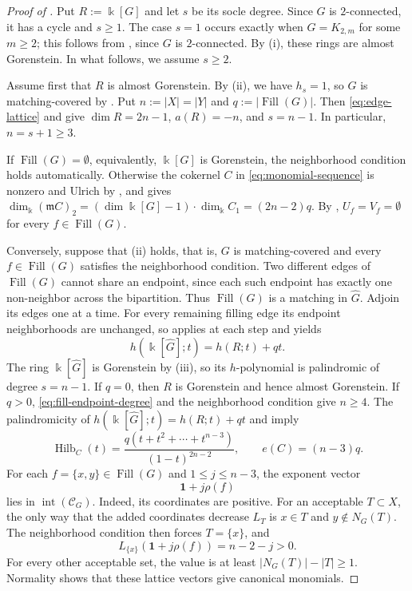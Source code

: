 \documentclass[a4paper,reqno,11pt]{amsart}
\theoremstyle{definition}
\theoremstyle{remark}
\numberwithin{equation}{section}
\newcommand{\kk}{\Bbbk}
\newcommand{\one}{\mathbf 1}
\newcommand{\frakm}{\mathfrak m}
\newcommand{\Fill}{\operatorname{Fill}}
\DeclareMathOperator{\relint}{int}
\newcommand{\Hilb}{\operatorname{Hilb}}
\begin{document}
\begin{proof}[Proof of ]
    Put $R:=\kk[G]$ and let $s$ be its socle degree.
    Since $G$ is $2$-connected, it has a cycle and $s\ge1$.
    The case $s=1$ occurs exactly when $G=K_{2,m}$ for some $m\ge2$; this follows from \cite[Lemma~4.2 and Theorem~4.6 and its proof]{ohsugi1999quadratic}, since $G$ is $2$-connected.
    By  (i), these rings are almost Gorenstein.
    In what follows, we assume $s\ge2$.

    Assume first that $R$ is almost Gorenstein.
    By  (ii), we have $h_s=1$, so $G$ is matching-covered by .
    Put $n:=|X|=|Y|$ and $q:=|\Fill(G)|$.
    Then \eqref{eq:edge-lattice} and  give $\dim R=2n-1$, $a(R)=-n$, and $s=n-1$.
    In particular, $n=s+1\ge3$.

    If $\Fill(G)=\emptyset$, equivalently, $\kk[G]$ is Gorenstein, the neighborhood condition holds automatically.
    Otherwise the cokernel $C$ in \eqref{eq:monomial-sequence} is nonzero and Ulrich by , and  gives $\dim_\kk (\frakm C)_2 =(\dim \kk[G]-1)\cdot \dim_\kk C_1=(2n-2)q$.
    By , $U_f=V_f=\emptyset$ for every $f\in\Fill(G)$.

    Conversely, suppose that (ii) holds, that is, $G$ is matching-covered and every $f\in \Fill(G)$ satisfies the neighborhood condition.
    Two different edges of $\Fill(G)$ cannot share an endpoint, since each such endpoint has exactly one non-neighbor across the bipartition.
    Thus $\Fill(G)$ is a matching in $\widehat G$.
    Adjoin its edges one at a time.
    For every remaining filling edge its endpoint neighborhoods are unchanged, so  applies at each step and yields
    \begin{equation}\label{eq:closure-h}
        h(\kk[\widehat G];t)=h(R;t)+qt.
    \end{equation}
    The ring $\kk[\widehat G]$ is Gorenstein by  (iii), so its $h$-polynomial is palindromic of degree $s=n-1$.
    If $q=0$, then $R$ is Gorenstein and hence almost Gorenstein.
    If $q>0$, \eqref{eq:fill-endpoint-degree} and the neighborhood condition give $n\ge4$.
    The palindromicity of $h(\kk[\widehat G];t)=h(R;t)+qt$ and  imply
    \begin{equation*}
        \Hilb_C(t)=\frac{q(t+t^2+\cdots+t^{n-3})}{(1-t)^{2n-2}},
        \qquad e(C)=(n-3)q.
    \end{equation*}
    For each $f=\{x,y\}\in\Fill(G)$ and $1\le j\le n-3$, the exponent vector
    \[
        \one+j\rho(f)
    \]
    lies in $\relint(\mathcal C_G)$.
    Indeed, its coordinates are positive.
    For an acceptable $T\subset X$, the only way that the added coordinates decrease $L_T$ is $x\in T$ and $y\notin N_G(T)$.
    The neighborhood condition then forces $T=\{x\}$, and
    \[
        L_{\{x\}}(\one+j\rho(f))=n-2-j>0.
    \]
    For every other acceptable set, the value is at least $|N_G(T)|-|T|\ge1$.
    Normality shows that these lattice vectors give canonical monomials.


\end{proof}
\end{document}
